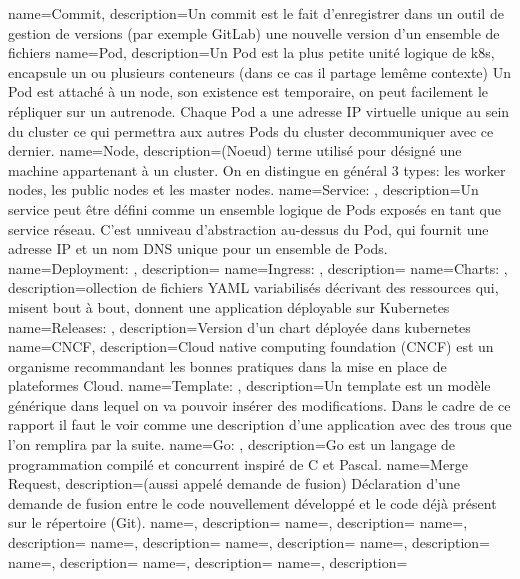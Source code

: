 {
    name=Commit,
    description={Un commit est le fait d’enregistrer dans un outil de gestion de versions (par exemple GitLab) une nouvelle version d’un ensemble de fichiers}
}
{
    name=Pod,
    description={Un Pod est la plus petite unité logique de k8s, encapsule un ou plusieurs conteneurs (dans ce cas il partage lemême contexte) Un Pod est attaché à un node, son existence est temporaire, on peut facilement le répliquer sur un autrenode. Chaque Pod a une adresse IP virtuelle unique au sein du cluster ce qui permettra aux autres Pods du cluster decommuniquer avec ce dernier.}
}
{
    name=Node,
    description={(Noeud) terme utilisé pour désigné une machine appartenant à un cluster. On en distingue en général 3 types: les worker nodes, les public nodes et les master nodes.}
}
{
    name=Service: ,
    description={Un service peut être défini comme un ensemble logique de Pods exposés en tant que service réseau. C’est unniveau d’abstraction au-dessus du Pod, qui fournit une adresse IP et un nom DNS unique pour un ensemble de Pods.}
}
{
    name=Deployment: ,
    description={}
}
{
    name=Ingress: ,
    description={}
}
{
    name=Charts: ,
    description={ollection de fichiers YAML variabilisés décrivant des ressources qui, misent bout à bout, donnent une application déployable sur Kubernetes}
}
{
    name=Releases: ,
    description={Version d'un chart déployée dans kubernetes}
}
{
    name=CNCF,
    description={Cloud native computing foundation (CNCF) est un organisme recommandant les bonnes pratiques dans la mise en place de plateformes Cloud.}
}
{
    name=Template: ,
    description={Un template est un modèle générique dans lequel on va pouvoir insérer des modifications. Dans le cadre de ce rapport il faut le voir comme une description d'une application avec des trous que l'on remplira par la suite.}
}
{
    name=Go: ,
    description={Go est un langage de programmation compilé et concurrent inspiré de C et Pascal.}
}
{
    name=Merge Request,
    description={(aussi appelé demande de fusion) Déclaration d'une demande de fusion entre le code nouvellement développé et le code déjà présent sur le répertoire (Git).}
}
{
    name=,
    description={}
}
{
    name=,
    description={}
}
{
    name=,
    description={}
}
{
    name=,
    description={}
}
\newglossaryentry{}
{
    name=,
    description={}
}
\newglossaryentry{}
{
    name=,
    description={}
}
\newglossaryentry{}
{
    name=,
    description={}
}
\newglossaryentry{}
{
    name=,
    description={}
}
\newglossaryentry{}
{
    name=,
    description={}
}



